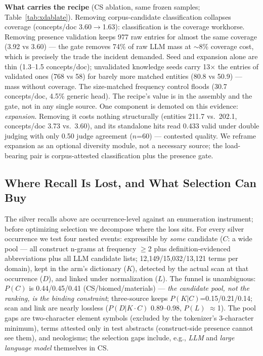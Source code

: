 \documentclass[sigconf,nonacm,anonymous]{acmart}
\begin{document}
\textbf{What carries the recipe} (CS ablation, same frozen samples;
Table~\ref{tab:xdablate}). Removing corpus-candidate classification
collapses coverage (concepts/doc 3.60$\to$1.63): classification is the
coverage workhorse. Removing presence validation keeps 977 raw entries
for almost the same coverage (3.92 vs 3.60) --- the gate removes 74\%
of raw LLM mass at ${\sim}$8\% coverage cost, which is precisely the
trade the incident demanded. Seed and expansion alone are thin (1.3--1.5
concepts/doc); unvalidated knowledge seeds carry 13$\times$ the entries
of validated ones (768 vs 58) for barely more matched entities (80.8
vs 50.9) --- mass without coverage. The size-matched frequency control
floods (30.7 concepts/doc, 4.5\% generic head). The recipe's value is
in the assembly and the gate, not in any single source. One component is demoted on this evidence: \emph{expansion}.
Removing it costs nothing structurally (entities 211.7 vs.\ 202.1,
concepts/doc 3.73 vs.\ 3.60), and its standalone hits read 0.433
valid under double judging with only 0.50 judge agreement ($n$=60) ---
contested quality. We reframe expansion as an optional
diversity module, not a necessary source; the load-bearing pair is
corpus-attested classification plus the presence gate.

\subsection{Where Recall Is Lost, and What Selection Can Buy}
\label{sec:funnel}

The silver recalls above are occurrence-level against an enumeration
instrument; before optimizing selection we decompose where the loss
sits. For every silver occurrence we test four nested events:
expressible by \emph{some} candidate ($C$: a wide pool --- all
construct n-grams at frequency ${\ge}$2 plus definition-evidenced
abbreviations plus all LLM candidate lists; 12{,}149/15{,}032/13{,}121
terms per domain), kept in the arm's dictionary ($K$), detected by the
actual scan at that occurrence ($D$), and linked under normalization
($L$). The funnel is unambiguous: $P(C)$ is 0.44/0.45/0.41
(CS/biomed/materials) --- \emph{the candidate pool, not the ranking,
is the binding constraint}; three-source keeps $P(K|C)$=0.15/0.21/0.14;
scan and link are nearly lossless ($P(D|K{\cdot}C)$ 0.89--0.98,
$P(L)$ $\approx$1). The pool gaps are two-character element symbols
(excluded by the tokenizer's 3-character minimum), terms attested only
in test abstracts (construct-side presence cannot see them), and
neologisms; the selection gaps include, e.g., \emph{LLM} and
\emph{large language model} themselves in CS.
\end{document}
